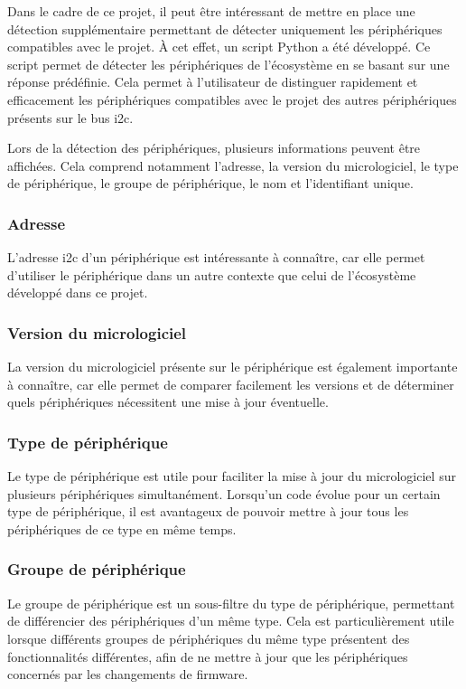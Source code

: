 Dans le cadre de ce projet, il peut être intéressant de mettre en place une détection supplémentaire permettant de détecter uniquement les périphériques compatibles avec le projet.
À cet effet, un script Python a été développé.
Ce script permet de détecter les périphériques de l'écosystème en se basant sur une réponse prédéfinie.
Cela permet à l'utilisateur de distinguer rapidement et efficacement les périphériques compatibles avec le projet des autres périphériques présents sur le bus \gls{i2c}.

Lors de la détection des périphériques, plusieurs informations peuvent être affichées.
Cela comprend notamment l'adresse, la version du micrologiciel, le type de périphérique, le groupe de périphérique, le nom et l'identifiant unique.

\subsubsection{Adresse}

L'adresse \gls{i2c} d'un périphérique est intéressante à connaître, car elle permet d'utiliser le périphérique dans un autre contexte que celui de l'écosystème développé dans ce projet.

\subsubsection{Version du micrologiciel}

La version du micrologiciel présente sur le périphérique est également importante à connaître, car elle permet de comparer facilement les versions et de déterminer quels périphériques nécessitent une mise à jour éventuelle.

\subsubsection{Type de périphérique}

Le type de périphérique est utile pour faciliter la mise à jour du micrologiciel sur plusieurs périphériques simultanément.
Lorsqu'un code évolue pour un certain type de périphérique, il est avantageux de pouvoir mettre à jour tous les périphériques de ce type en même temps.

\subsubsection{Groupe de périphérique}

Le groupe de périphérique est un sous-filtre du type de périphérique, permettant de différencier des périphériques d'un même type.
Cela est particulièrement utile lorsque différents groupes de périphériques du même type présentent des fonctionnalités différentes, afin de ne mettre à jour que les périphériques concernés par les changements de firmware.

